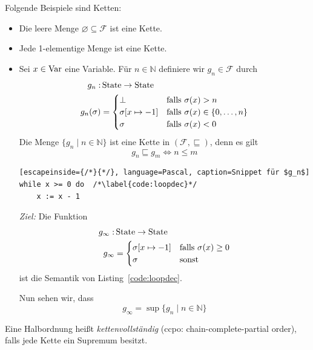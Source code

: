 \begin{example}
    Folgende Beispiele sind Ketten:
    \begin{itemize}
        \item Die leere Menge $\varnothing \subseteq \mathcal{F}$ ist eine Kette.
        \item Jede 1-elementige Menge ist eine Kette.
        \item Sei $x \in \operatorname{Var}$ eine Variable. Für $n \in \mathbb{N}$ definiere wir $g_n \in \mathcal{F}$ durch \begin{align*}
                g_n: & \operatorname{State} \to \operatorname{State} \\
                g_n(\sigma) & = \begin{cases}
                    \bot & \text{falls } \sigma(x) > n \\
                    \sigma[x \mapsto -1] & \text{falls } \sigma(x) \in \{ 0, \dots, n \} \\
                    \sigma & \text{falls } \sigma(x) < 0
                \end{cases}
            \end{align*}
            Die Menge $\{ g_n \mid n \in \mathbb{N} \}$ ist eine Kette in $(\mathcal{F}, \sqsubseteq)$, denn es gilt \[
                    g_n \sqsubseteq g_m \Leftrightarrow n \leq m
                \]
\begin{lstlisting}[escapeinside={/*}{*/}, language=Pascal, caption=Snippet für $g_n$]
while x >= 0 do  /*\label{code:loopdec}*/
    x := x - 1
\end{lstlisting}
            \emph{Ziel:} Die Funktion \begin{align*}
                g_{\infty}: & \operatorname{State} \to \operatorname{State} \\
                g_{\infty} & = \begin{cases}
                    \sigma[x \mapsto -1] & \text{falls } \sigma(x) \geq 0 \\
                    \sigma & \text{sonst}
                \end{cases}
            \end{align*}
            ist die Semantik von Listing~\ref{code:loopdec}.

            Nun sehen wir, dass \[
                g_{\infty} = \sup \{ g_n \mid n \in \mathbb{N} \}
            \]
    \end{itemize}
\end{example}

\par\bigskip
\begin{definition}[Kettenvollständigkeit]
    Eine Halbordnung heißt \emph{kettenvollständig} (ccpo: chain-complete-partial order), falls jede Kette ein Supremum besitzt.
\end{definition}

